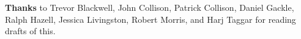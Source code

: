\textbf{Thanks} to Trevor
                  Blackwell, John Collison, Patrick Collison, Daniel Gackle,
                  Ralph Hazell, Jessica Livingston, Robert Morris, and Harj
                  Taggar for reading drafts of this.


              
            
          
            
              
                


                  
              
            
          
